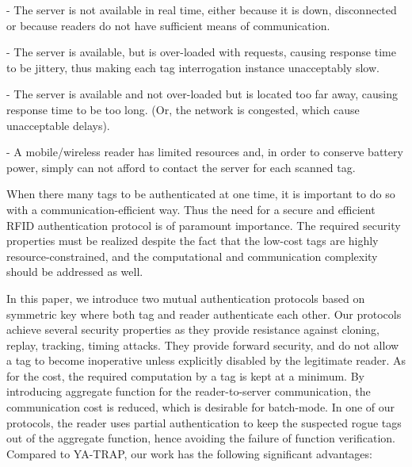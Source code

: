 \documentclass{easychair}
\begin{document}
- The server is not available in real time, either because it is down, disconnected
or because readers do not have sufficient means of communication.

- The server is available, but is over-loaded with requests, causing response
time to be jittery, thus making each tag interrogation instance unacceptably
slow.

- The server is available and not over-loaded but is located too far away,
causing response time to be too long. (Or, the network is congested, which
cause unacceptable delays).

- A mobile/wireless reader has limited resources and, in order to conserve
battery power, simply can not afford to contact the server for each scanned
tag.

When there many tags to be authenticated at one time, it is important to do so with a communication-efficient way. Thus the need for a secure and efficient RFID authentication protocol is of paramount importance. The required security properties must be realized despite the fact that the low-cost tags are highly resource-constrained, and the computational and communication complexity should be addressed as well.  

 In this paper, we introduce two mutual authentication protocols based on symmetric key where both tag and reader
authenticate each other. Our protocols achieve several security properties as they provide 
resistance against cloning, replay, tracking, timing attacks. They provide forward security, and do not allow a tag to become inoperative unless 
explicitly disabled by the legitimate reader. As for the cost, the required computation by a tag is kept at a minimum. By introducing aggregate function for the reader-to-server communication, the communication cost is reduced, which is desirable for batch-mode. In one of our protocols, the reader uses partial authentication to 
keep the suspected rogue tags out of the aggregate function, hence avoiding the failure of function verification.  Compared to YA-TRAP, our work has the following significant advantages:
\end{document}
